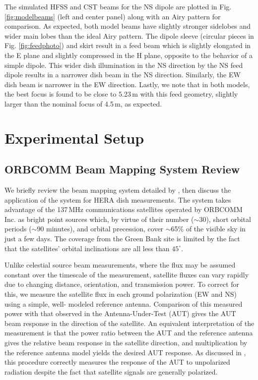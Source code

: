 \documentclass{emulateapj}
\begin{document}
The simulated HFSS and CST beams for the NS dipole are plotted in Fig. \ref{fig:modelbeams} (left and center panel) along with an Airy pattern for comparison. As expected, both model beams have slightly stronger sidelobes and wider main lobes than the ideal Airy pattern. The dipole sleeve (circular pieces in Fig. \ref{fig:feedphoto}) and skirt result in a feed beam which is slightly elongated in the E plane and slightly compressed in the H plane, opposite to the behavior of a simple dipole. This wider dish illumination in the NS direction by the NS feed dipole results in a narrower dish beam in the NS direction. Similarly, the EW dish beam is narrower in the EW direction. Lastly, we note that in both models, the best focus is found to be close to 5.23\,m with this feed geometry, slightly larger than the nominal focus of 4.5\,m, as expected.

\section{Experimental Setup}

\subsection{ORBCOMM Beam Mapping System Review}
\label{sec:orbcommreview}

We briefly review the beam mapping system detailed by \citet{neben15}, then discuss the 
application of the system for HERA dish measurements. The system 
takes advantage of the 137\,MHz communications satellites operated by ORBCOMM Inc. 
as bright point sources which, by virtue of their number ($\sim30$), short orbital periods 
($\sim90$ minutes), and orbital precession, cover $\sim$65\% of the visible sky in just a few 
days. The coverage from the Green Bank site is limited by the fact that the satellites' orbital inclinations are all less 
than $45^\circ$. 

Unlike celestial source beam measurements, where the flux may be 
assumed constant over the timescale of the measurement, satellite fluxes can vary rapidly 
due to changing distance, orientation, and transmission power. To correct for this, we 
measure the satellite flux in each ground polarization (EW and NS) using a simple, well-
modeled reference antenna. Comparison of this measured power with that observed in the 
Antenna-Under-Test (AUT) gives the AUT beam response in the direction of the satellite. 
An equivalent interpretation of the measurement is that the power ratio between the AUT and the reference 
antenna gives the relative beam response in the satellite direction, and multiplication by 
the reference antenna model yields the desired AUT response. As discussed in 
\citet{neben15}, this procedure correctly measures the response of the AUT to unpolarized radiation
 despite the fact that satellite signals are generally polarized.
\end{document}
